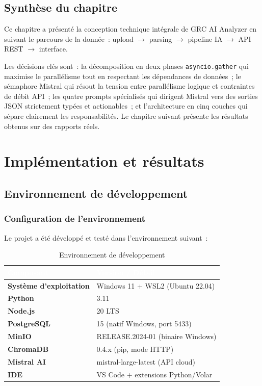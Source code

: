 \documentclass[a4paper,12pt,oneside]{report}
\newcommand{\colhead}[1]{\textcolor{white}{\bfseries #1}}
\newcommand{\headrow}{\rowcolor{headerblue}}
\begin{document}
	\section{Synth\`ese du chapitre}
	
	Ce chapitre a pr\'esent\'e la conception technique int\'egrale
	de GRC AI Analyzer en suivant le parcours de la donn\'ee~:
	upload $\to$ parsing $\to$ pipeline IA $\to$ API REST $\to$ interface.
	
	Les d\'ecisions cl\'es sont~:
	la d\'ecomposition en deux phases \texttt{asyncio.gather} qui maximise
	le parall\'elisme tout en respectant les d\'ependances de donn\'ees~;
	le s\'emaphore Mistral qui r\'esout la tension entre parall\'elisme
	logique et contraintes de d\'ebit API~;
	les quatre prompts sp\'ecialis\'es qui dirigent Mistral vers des
	sorties JSON strictement typ\'ees et actionables~;
	et l'architecture en cinq couches qui s\'epare clairement les
	responsabilit\'es.
	Le chapitre suivant pr\'esente les r\'esultats obtenus sur des
	rapports r\'eels.
	
	
	\chapter{Implémentation et résultats}
	
	\section{Environnement de développement}
	
	\subsection{Configuration de l'environnement}
	
	Le projet a été développé et testé dans l'environnement suivant~:
	
	\begin{table}[H]
		\centering
		\begin{tabularx}{\textwidth}{@{}>{\bfseries\color{titleblue}}l X@{}}
			\toprule
			\headrow \colhead{Composant} & \colhead{Version / D\'etail} \\
			\midrule
			Syst\`eme d'exploitation & Windows 11 + WSL2 (Ubuntu 22.04) \\
			\rowcolor{rowalt} Python & 3.11 \\
			Node.js & 20 LTS \\
			\rowcolor{rowalt} PostgreSQL & 15 (natif Windows, port 5433) \\
			MinIO & RELEASE.2024-01 (binaire Windows) \\
			\rowcolor{rowalt} ChromaDB & 0.4.x (pip, mode HTTP) \\
			Mistral AI & mistral-large-latest (API cloud) \\
			\rowcolor{rowalt} IDE & VS Code + extensions Python/Volar \\
			\bottomrule
		\end{tabularx}
		\caption{Environnement de d\'eveloppement}
		\label{tab:env-dev}
	\end{table}
	
\end{document}
